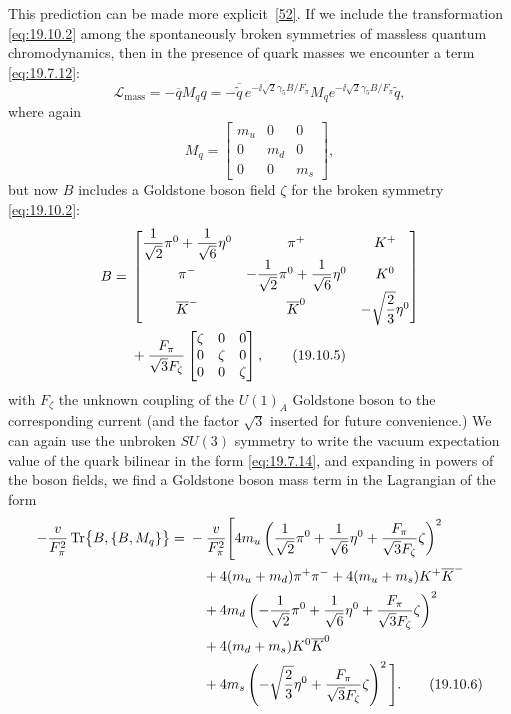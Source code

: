 This prediction can be made more explicit~\hyperref[ch19-ref-52]{[52]}. If we include the transformation \eqref{eq:19.10.2} among the spontaneously broken symmetries of massless quantum chromodynamics, then in the presence of quark masses we encounter a term \eqref{eq:19.7.12}:
\begin{equation}
\mathcal L_{\mathrm{mass}}
=-\overline q M_q q
=-\overline{\widetilde q}\,
e^{-\ii\sqrt{2}\gamma_5B/F_\pi}
M_q
e^{-\ii\sqrt{2}\gamma_5B/F_\pi}
\widetilde q,
\tag{19.10.3}\label{eq:19.10.3}
\end{equation}
where again
\begin{equation}
M_q=
\begin{bmatrix}
m_u&0&0\\
0&m_d&0\\
0&0&m_s
\end{bmatrix},
\tag{19.10.4}\label{eq:19.10.4}
\end{equation}
but now $B$ includes a Goldstone boson field $\zeta$ for the broken symmetry \eqref{eq:19.10.2}:
\begin{align}
B={}&
\begin{bmatrix}
\dfrac{1}{\sqrt2}\pi^0+\dfrac{1}{\sqrt6}\eta^0
&\pi^+&K^+\\[4pt]
\pi^-&
-\dfrac{1}{\sqrt2}\pi^0+\dfrac{1}{\sqrt6}\eta^0
&K^0\\[4pt]
\overline K^-&\overline K^0&-\sqrt{\dfrac23}\eta^0
\end{bmatrix}
\notag\\
&+\frac{F_\pi}{\sqrt3F_\zeta}
\begin{bmatrix}
\zeta&0&0\\
0&\zeta&0\\
0&0&\zeta
\end{bmatrix},
\tag{19.10.5}\label{eq:19.10.5}
\end{align}
with $F_\zeta$ the unknown coupling of the $U(1)_A$ Goldstone boson to the corresponding current (and the factor $\sqrt3$ inserted for future convenience.) We can again use the unbroken $SU(3)$ symmetry to write the vacuum expectation value of the quark bilinear in the form \eqref{eq:19.7.14}, and expanding in powers of the boson fields, we find a Goldstone boson mass term in the Lagrangian of the form
\begin{align}
-\frac{v}{F_\pi^2}
\operatorname{Tr}\bigl\{B,\{B,M_q\}\bigr\}
={}&-\frac{v}{F_\pi^2}\Bigg[
4m_u\left(
\frac{1}{\sqrt2}\pi^0+\frac{1}{\sqrt6}\eta^0
+\frac{F_\pi}{\sqrt3F_\zeta}\zeta
\right)^2
\notag\\
&\quad+4(m_u+m_d)\pi^+\pi^-
+4(m_u+m_s)K^+\overline K^-
\notag\\
&\quad+4m_d\left(
-\frac{1}{\sqrt2}\pi^0+\frac{1}{\sqrt6}\eta^0
+\frac{F_\pi}{\sqrt3F_\zeta}\zeta
\right)^2
\notag\\
&\quad+4(m_d+m_s)K^0\overline K^0
\notag\\
&\quad+4m_s\left(
-\sqrt{\frac23}\eta^0
+\frac{F_\pi}{\sqrt3F_\zeta}\zeta
\right)^2
\Bigg].
\tag{19.10.6}\label{eq:19.10.6}
\end{align}

